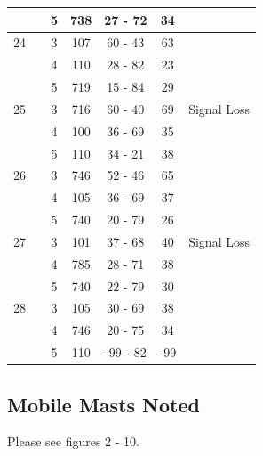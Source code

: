 \documentclass[a4paper,12pt]{article}
\begin{document}
\begin{tabular}{|c|c|c|c|c|c|c|}
 	&		&	 5	&	738	&	27 - 72	&	34	&		\\
\hline	
24	&		&	 3	&	107	&	60 - 43	&	63	&	 	\\
 	&		&	 4	&	110	&	28 - 82	&	23	&		\\
 	&		&	 5	&	719	&	15 - 84	&	29	&		\\
\hline	
25	&		&	 3	&	716	&	60 - 40	&	69	&Signal Loss \\
 	&		&	 4	&	100	&	36 - 69	&	35	&		\\
 	&		&	 5	&	110	&	34 - 21	&	38	&		\\
\hline	
26	&		&	 3	&	746	&	52 - 46	&	65	&		\\
 	&		&	 4	&	105	&	36 - 69	&	37	&		\\
 	&		&	 5	&	740	&	20 - 79	&	26	&		\\
\hline	
27	&		&	 3	&	101	&	37 - 68	&	40	&Signal Loss \\
 	&		&	 4	&	785	&	28 - 71	&	38	&		\\
 	&		&	 5	&	740	&	22 - 79	&	30	&		\\
\hline	
28	&		&	 3	&	105	&	30 - 69	&	38	&		\\
 	&		&	 4	&	746	&	20 - 75	&	34	&		\\
 	&		&	 5	&	110	&	-99 - 82	&	-99	&		\\
\hline
\end{tabular}

\subsection{Mobile Masts Noted}

Please see figures 2 - 10.
\end{document}
